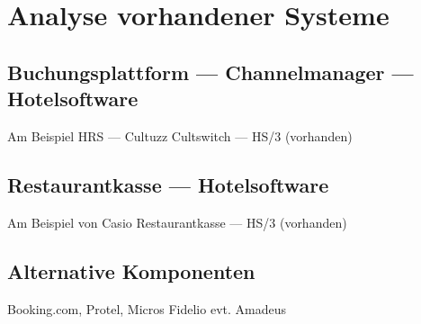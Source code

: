 \label{sec:hauptteil}

\section{Analyse vorhandener Systeme} %
\label{sec:analyse_vorhandener_systeme}
\subsection{Buchungsplattform — Channelmanager — Hotelsoftware} %
\label{sub:buchungsplattform_channelmanager_hotelsoftware}
Am Beispiel HRS — Cultuzz Cultswitch — HS/3 (vorhanden)

\subsection{Restaurantkasse — Hotelsoftware} %
\label{sub:restaurantkasse_hotelsoftware}
Am Beispiel von Casio Restaurantkasse — HS/3 (vorhanden)

\subsection{Alternative Komponenten} %
\label{sub:alternative_komponenten}
Booking.com, Protel, Micros Fidelio
evt. Amadeus
